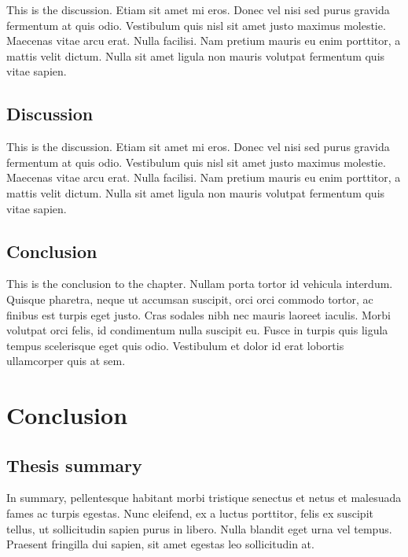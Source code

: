 This is the discussion. Etiam sit amet mi eros. Donec vel nisi sed
purus gravida fermentum at quis odio. Vestibulum quis nisl sit amet
justo maximus molestie. Maecenas vitae arcu erat. Nulla facilisi.
Nam pretium mauris eu enim porttitor, a mattis velit dictum. Nulla
sit amet ligula non mauris volutpat fermentum quis vitae sapien.

\hypertarget{discussion-2}{%
\subsection{Discussion}\label{discussion-2}}

This is the discussion. Etiam sit amet mi eros. Donec vel nisi sed
purus gravida fermentum at quis odio. Vestibulum quis nisl sit amet
justo maximus molestie. Maecenas vitae arcu erat. Nulla facilisi.
Nam pretium mauris eu enim porttitor, a mattis velit dictum. Nulla
sit amet ligula non mauris volutpat fermentum quis vitae sapien.

\hypertarget{conclusion-2}{%
\subsection{Conclusion}\label{conclusion-2}}

This is the conclusion to the chapter. Nullam porta tortor id
vehicula interdum. Quisque pharetra, neque ut accumsan suscipit,
orci orci commodo tortor, ac finibus est turpis eget justo. Cras
sodales nibh nec mauris laoreet iaculis. Morbi volutpat orci felis,
id condimentum nulla suscipit eu. Fusce in turpis quis ligula tempus
scelerisque eget quis odio. Vestibulum et dolor id erat lobortis
ullamcorper quis at sem.

\hypertarget{conclusion-3}{%
\section{Conclusion}\label{conclusion-3}}

\hypertarget{thesis-summary}{%
\subsection{Thesis summary}\label{thesis-summary}}

In summary, pellentesque habitant morbi tristique senectus et netus
et malesuada fames ac turpis egestas. Nunc eleifend, ex a luctus
porttitor, felis ex suscipit tellus, ut sollicitudin sapien purus in
libero. Nulla blandit eget urna vel tempus. Praesent fringilla dui
sapien, sit amet egestas leo sollicitudin at.

